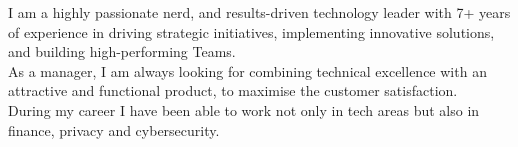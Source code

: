 
\begin{cvparagraph}
    I am a highly passionate nerd, and results-driven technology leader with 7+ years of experience in driving strategic initiatives, implementing innovative solutions, and building high-performing Teams.
    \\As a manager, I am always looking for combining technical excellence with an attractive and functional product, to maximise the customer satisfaction.
    \\During my career I have been able to work not only in tech areas but also in finance, privacy and cybersecurity.
\end{cvparagraph}